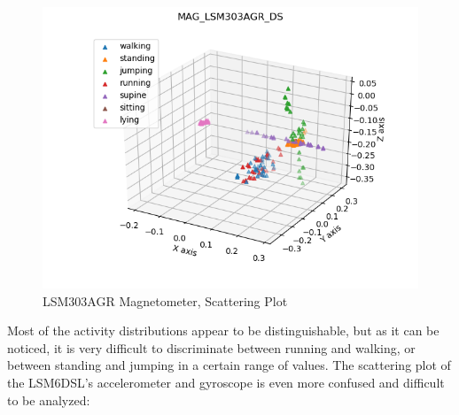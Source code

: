 \begin{figure}[H]
	\hfill\includegraphics[scale=0.8]{figures/scatter3d_MAG_LSM303AGR_DS.png}\hspace*{\fill}
	\caption{LSM303AGR Magnetometer, Scattering Plot }\label{fig:8}
	\centering
\end{figure}
Most of the activity distributions appear to be distinguishable, but as it can be noticed, it is very difficult to discriminate between running and walking, or between standing and jumping in a certain range of values. The scattering plot of the LSM6DSL's accelerometer and gyroscope is even more confused and difficult to be analyzed:
